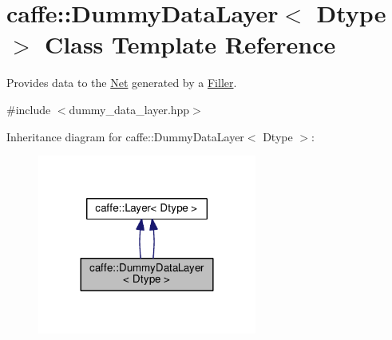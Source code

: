 \hypertarget{classcaffe_1_1_dummy_data_layer}{}\section{caffe\+:\+:Dummy\+Data\+Layer$<$ Dtype $>$ Class Template Reference}
\label{classcaffe_1_1_dummy_data_layer}


Provides data to the \mbox{\hyperlink{classcaffe_1_1_net}{Net}} generated by a \mbox{\hyperlink{classcaffe_1_1_filler}{Filler}}.  




{\ttfamily \#include $<$dummy\+\_\+data\+\_\+layer.\+hpp$>$}



Inheritance diagram for caffe\+:\+:Dummy\+Data\+Layer$<$ Dtype $>$\+:
\nopagebreak
\begin{figure}[H]
\begin{center}
\leavevmode
\includegraphics[width=204pt]{classcaffe_1_1_dummy_data_layer__inherit__graph}
\end{center}
\end{figure}
